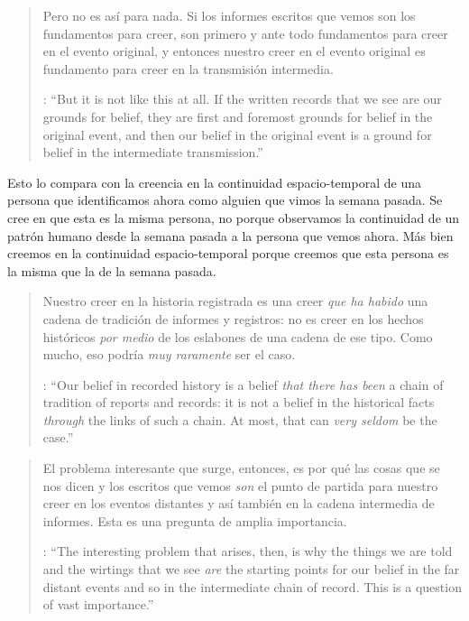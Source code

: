 \blockquote[{\cite[121--122]{anscombe2011plato:humecaus}}: \enquote{But it is not like this at all. If the written records that we see are our grounds for belief, they are first and foremost grounds for belief in the original event, and then our belief in the original event is a ground for belief in the intermediate transmission.}]{Pero no es así para nada. Si los informes escritos que vemos son los fundamentos para creer, son primero y ante todo fundamentos para creer en el evento original, y entonces nuestro creer en el evento original es fundamento para creer en la transmisión intermedia.}

Esto lo compara con la creencia en la continuidad espacio-temporal de una persona que identificamos ahora como alguien que vimos la semana pasada. Se cree en que esta es la misma persona, no porque observamos la continuidad de un patrón humano desde la semana pasada a la persona que vemos ahora. Más bien creemos en la continuidad espacio-temporal porque creemos que esta persona es la misma que la de la semana pasada.

\blockquote[{\cite[121--122]{anscombe2011plato:humecaus}}: \enquote{Our belief in recorded history is a belief \emph{that there has been} a chain of tradition of reports and records: it is not a belief in the historical facts \emph{through} the links of such a chain. At most, that can \emph{very seldom} be the case.}]{Nuestro creer en la historia registrada es una creer \emph{que ha habido} una cadena de tradición de informes y registros: no es creer en los hechos históricos \emph{por medio} de los eslabones de una cadena de ese tipo. Como mucho, eso podría \emph{muy raramente} ser el caso.}

\blockquote[{\cite[121--122]{anscombe2011plato:humecaus}}: \enquote{The interesting problem that arises, then, is why the things we are told and the wirtings that we see \emph{are} the starting points for our belief in the far distant events and so in the intermediate chain of record. This is a question of vast importance.}]{El problema interesante que surge, entonces, es por qué las cosas que se nos dicen y los escritos que vemos \emph{son} el punto de partida para nuestro creer en los eventos distantes y así también en la cadena intermedia de informes. Esta es una pregunta de amplia importancia.}




